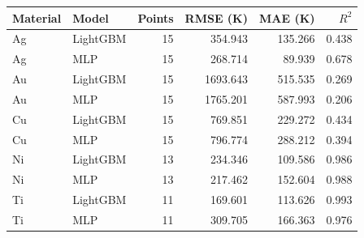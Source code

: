 \begin{tabular}{llrrrr}
\toprule
Material & Model & Points & RMSE (K) & MAE (K) & $R^2$ \\
\midrule
Ag & LightGBM & 15 & 354.943 & 135.266 & 0.438 \\
Ag & MLP & 15 & 268.714 & 89.939 & 0.678 \\
Au & LightGBM & 15 & 1693.643 & 515.535 & 0.269 \\
Au & MLP & 15 & 1765.201 & 587.993 & 0.206 \\
Cu & LightGBM & 15 & 769.851 & 229.272 & 0.434 \\
Cu & MLP & 15 & 796.774 & 288.212 & 0.394 \\
Ni & LightGBM & 13 & 234.346 & 109.586 & 0.986 \\
Ni & MLP & 13 & 217.462 & 152.604 & 0.988 \\
Ti & LightGBM & 11 & 169.601 & 113.626 & 0.993 \\
Ti & MLP & 11 & 309.705 & 166.363 & 0.976 \\
\bottomrule
\end{tabular}
